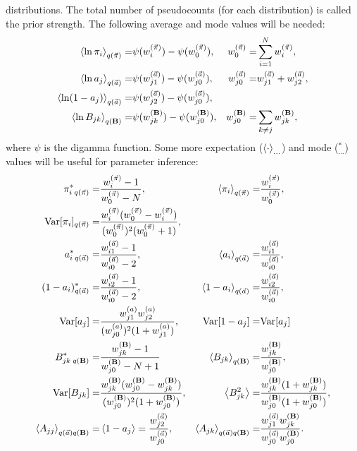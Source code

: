 distributions.  The total number of pseudocounts (for each
distribution) is called the prior strength. The following
average\cite{Beal2003} and mode values will be needed:
\begin{align}
  \left\langle \ln \pi_i\right\rangle_{q(\vec{\pi})}=&\psi(w_i^{(\vec{\pi})})-\psi(w_0^{(\vec{\pi})}),
  &w_0^{(\vec{\pi})}=&\sum_{i=1}^Nw_i^{(\vec{\pi})},\label{lnpiaverage}\\
  \left\langle \ln a_j\right\rangle_{q(\vec{a})}=&\psi(w_{j1}^{(\vec{a})})-\psi(w_{j0}^{(\vec{a})}),&
  w_{j0}^{(\vec{a})}=&w_{j1}^{(\vec{a})}+w_{j2}^{(\vec{a})},\\
  \left\langle \ln (1-a_j)\right\rangle_{q(\vec{a})}=&\psi(w_{j2}^{(\vec{a})})-\psi(w_{j0}^{(\vec{a})}),\\
  \left\langle \ln B_{jk}\right\rangle_{q(\mathbf{B})}=&\psi(w_{jk}^{(\mathbf{B})})
    -\psi(w_{j0}^{(\mathbf{B})}),&
  w_{j0}^{(\mathbf{B})}=&\sum_{k\ne j}w_{jk}^{(\mathbf{B})},
\end{align}
where $\psi$ is the digamma function.  Some more expectation
($\left\langle \cdot\right\rangle_{\ldots}$) and mode ($^*_{\ldots}$) values will be
useful for parameter inference:
\begin{align}
  \pi^*_{i\;q(\vec\pi)}=&\frac{w_i^{(\vec\pi)}-1}{w_0^{(\vec\pi)}-N}, &
  \left\langle \pi_i\right\rangle_{q(\vec{\pi})}=&\frac{w_i^{(\vec\pi)}}{w_0^{(\vec\pi)}}, \\
  \text{Var}[\pi_i]_{q(\vec{\pi})}=&
  \frac{w_i^{(\vec\pi)}(w_0^{(\vec\pi)}-w_i^{(\vec\pi)})}{
    (w_0^{(\vec\pi)})^2(w_0^{(\vec\pi)}+1)},\\
  a^*_{i\;q(\vec a)}=&\frac{w_{i1}^{(\vec{a})}-1}{w_{i0}^{(\vec{a})}-2}, &
  \left\langle a_i\right\rangle_{q(\vec{a})}=&\frac{w_{i1}^{(\vec{a})}}{w_{i0}^{(\vec{a})}},\\
  (1-a_i)^*_{q(\vec{a})}=&\frac{w_{i2}^{(\vec{a})}-1}{w_{i0}^{(\vec{a})}-2}, &
  \left\langle 1-a_i\right\rangle_{q(\vec{a})}=&\frac{w_{i2}^{(\vec{a})}}{w_{i0}^{(\vec{a})}},\\
  \text{Var}[a_j]=&\frac{w_{j1}^{(a)}w_{j2}^{(a)}}{(w_{j0}^{(a)})^2(1+w_{j1}^{(a)})},&
\text{Var}[1-a_j]=&\text{Var}[a_j]\\
  B^*_{jk\;q(\mathbf{B})}=&\frac{w_{jk}^{(\mathbf{B})}-1}{w_{j0}^{(\mathbf{B})}-N+1}&
  \left\langle B_{jk}\right\rangle_{q(\mathbf{B})}=&\frac{w_{jk}^{(\mathbf{B})}}{w_{j0}^{(\mathbf{B})}},\\
\text{Var}[B_{jk}]=&
\frac{w_{jk}^{(\mathbf{B})}(w_{j0}^{(\mathbf{B})}-w_{jk}^{(\mathbf{B})})}{
(w_{j0}^{(\mathbf{B})})^2(1+w_{j0}^{(\mathbf{B})})},&
\left\langle B_{jk}^2\right\rangle=&\frac{w_{jk}^{(\mathbf{B})}(1+w_{jk}^{(\mathbf{B})})}{
        w_{j0}^{(\mathbf{B})}(1+w_{j0}^{(\mathbf{B})})},\\
\left\langle A_{jj}\right\rangle_{q(\vec{a})q(\mathbf{B})}=&
\left\langle 1-a_j\right\rangle=\frac{w_{j2}^{(\vec{a})}}{w_{j0}^{(\vec{a})}},&
\left\langle A_{jk}\right\rangle_{q(\vec{a})q(\mathbf{B})}=&
\frac{w_{j1}^{(\vec{a})}w_{jk}^{(\mathbf{B})}}{w_{j0}^{(\vec{a})}w_{j0}^{(\mathbf{B})}}.
\end{align}
